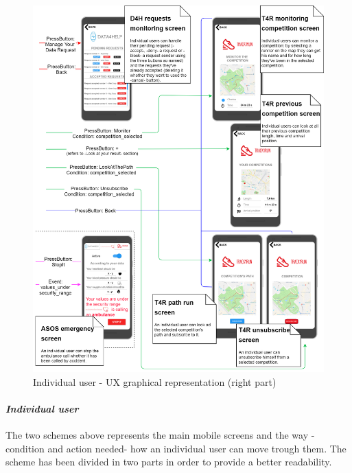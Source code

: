 \begin{figure}[H]
\caption{Individual user - UX graphical representation (right part)}
\includegraphics[width = \textwidth]{sections/userInterfacesGraphs/UserExperienceScreenDX.png}
\end{figure}
\paragraph{\textit{Individual user}}The two schemes above represents the main mobile screens and the way -condition and action needed- how an individual user can move trough them.
The scheme has been divided in two parts in order to provide a better readability. 
 
 
